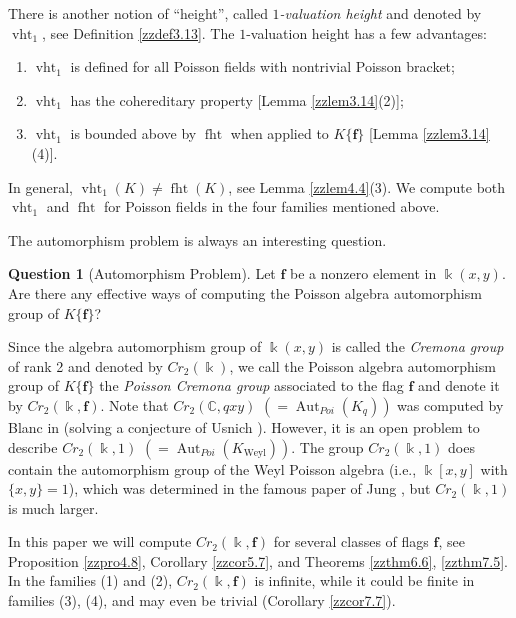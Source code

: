 \documentclass[12pt]{amsart}
\theoremstyle{plain}
\numberwithin{theorem}{section}
\numberwithin{equation}{theorem}
\theoremstyle{definition}
\newtheorem{question}[theorem]{Question}
\newcommand{\CC}{\mathbb{C}}
\DeclareMathOperator{\Aut}{Aut}
\DeclareMathOperator{\fht}{fht}
\DeclareMathOperator{\vht}{vht}
\newcommand \bff {{\mathbf{f}}}
\DeclareMathOperator{\Weyl}{Weyl}
\newcommand \Kweyl {K_{\Weyl}}
\begin{document}
There is another notion of ``height'', 
called {\it $1$-valuation height} and 
denoted by $\vht_1$, see Definition 
\ref{zzdef3.13}. The $1$-valuation height 
has a few advantages:

\begin{enumerate}
\item[(1)]
$\vht_1$ is defined for all Poisson 
fields with nontrivial Poisson bracket;
\item[(2)]
$\vht_1$ has the cohereditary property 
[Lemma \ref{zzlem3.14}(2)];
\item[(3)]
$\vht_1$ is bounded above by $\fht$ 
when applied to $K\{\bff\}$ 
[Lemma \ref{zzlem3.14}(4)].
\end{enumerate}

In general, $\vht_1(K)\neq \fht(K)$, 
see Lemma \ref{zzlem4.4}(3). We 
compute both $\vht_1$ and $\fht$ for 
Poisson fields in the four families 
mentioned above.

The automorphism problem is always 
an interesting question.

\begin{question}[Automorphism Problem]
\label{zzque0.8}
Let $\bff$ be a nonzero element in 
$\Bbbk(x,y)$. Are there any effective 
ways of computing the Poisson algebra 
automorphism group of $K\{\bff\}$?
\end{question}

Since the algebra automorphism group 
of $\Bbbk(x,y)$ is called the {\it 
Cremona group} of rank 2 and denoted 
by $Cr_2(\Bbbk)$, we call the Poisson 
algebra automorphism group of 
$K\{\bff\}$ the {\it Poisson 
Cremona group} associated to the 
flag $\bff$ and denote it by 
$Cr_2(\Bbbk,\bff)$. Note that 
$Cr_2(\CC,qxy)$ $(=\Aut_{Poi}(K_q))$ 
was computed by Blanc in 
\cite[Theorem 1]{Bl} (solving a 
conjecture of Usnich \cite{Us}). 
However, it is an open problem to 
describe $Cr_2(\Bbbk, 1)$ 
$(=\Aut_{Poi}(\Kweyl))$.  The group 
$Cr_2(\Bbbk, 1)$ does contain the 
automorphism group of the Weyl 
Poisson algebra (i.e., $\Bbbk[x,y]$ 
with $\{x,y\} = 1$), which was 
determined in the famous paper of 
Jung \cite{Jung}, but 
$Cr_2(\Bbbk, 1)$ is much larger.

In this paper we will compute 
$Cr_2(\Bbbk,\bff)$ for several 
classes of flags $\bff$, see 
Proposition \ref{zzpro4.8}, Corollary \ref{zzcor5.7}, and Theorems 
\ref{zzthm6.6}, \ref{zzthm7.5}.  
In the families (1) and (2), 
$Cr_2(\Bbbk,\bff)$ is infinite, 
while it could be finite in 
families (3), (4), and may even 
be trivial (Corollary \ref{zzcor7.7}).
\end{document}
